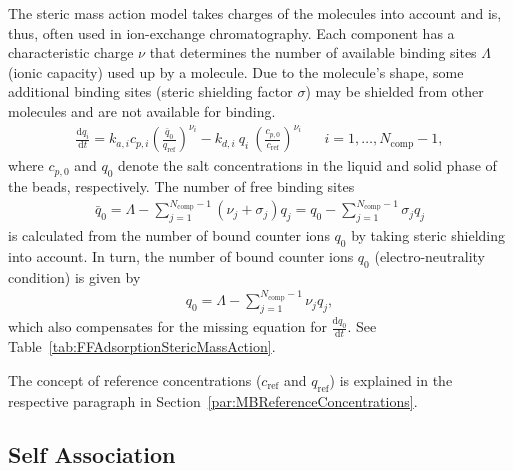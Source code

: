 The steric mass action model takes charges of the molecules into account \cite{Brooks1992} and is, thus, often used in ion-exchange chromatography. 
Each component has a characteristic charge $\nu$ that determines the number of available binding sites $\Lambda$ (ionic capacity) used up by a molecule.
Due to the molecule's shape, some additional binding sites (steric shielding factor $\sigma$) may be shielded from other molecules and are not available for binding.
\begin{align*}
  \frac{\mathrm{d} q_i}{\mathrm{d} t} = k_{a,i} c_{p,i}\left( \frac{\bar{q}_0 }{q_{\text{ref}}} \right)^{\nu_i} - k_{d,i}\: q_i\: \left(\frac{c_{p,0}}{c_{\text{ref}}}\right)^{\nu_i} && i = 1, \dots, N_{\text{comp}} - 1,
\end{align*}
where $c_{p,0}$ and $q_0$ denote the salt concentrations in the liquid and solid phase of the beads, respectively.
The number of free binding sites
\begin{align*}
  \bar{q}_0 = \Lambda - \sum_{j=1}^{N_{\text{comp}} - 1} \left( \nu_j + \sigma_j \right) q_j = q_0 - \sum_{j=1}^{N_{\text{comp}} - 1} \sigma_j q_j
\end{align*}
is calculated from the number of bound counter ions $q_0$ by taking steric shielding into account.
In turn, the number of bound counter ions $q_0$ (electro-neutrality condition) is given by
\begin{align*}
  q_0 = \Lambda - \sum_{j=1}^{N_{\text{comp}} - 1} \nu_j q_j,
\end{align*}
which also compensates for the missing equation for $\frac{\mathrm{d} q_0}{\mathrm{d}t}$.
See Table~\ref{tab:FFAdsorptionStericMassAction}.

The concept of reference concentrations ($c_{\text{ref}}$ and $q_{\text{ref}}$) is explained in the respective paragraph in Section~\ref{par:MBReferenceConcentrations}.

\subsection{Self Association}

